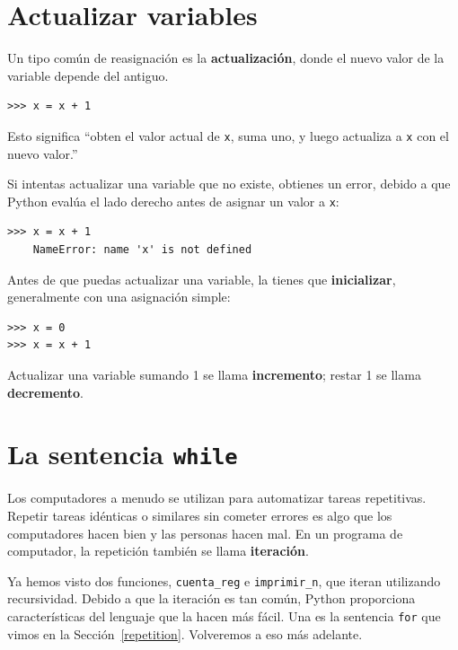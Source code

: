\documentclass[10pt]{book}
\begin{document}
\section{Actualizar variables}
\label{update}


Un tipo común de reasignación es la {\bf actualización},
donde el nuevo valor de la variable depende del antiguo.

\begin{verbatim}
>>> x = x + 1
\end{verbatim}
%
Esto significa ``obten el valor actual de {\tt x}, suma uno, y luego
actualiza a {\tt x} con el nuevo valor.''

Si intentas actualizar una variable que no existe, obtienes un
error, debido a que Python evalúa el lado derecho antes de asignar
un valor a {\tt x}:

\begin{verbatim}
>>> x = x + 1
    NameError: name 'x' is not defined
\end{verbatim}
%
Antes de que puedas actualizar una variable, la tienes que {\bf inicializar},
generalmente con una asignación simple:

\begin{verbatim}
>>> x = 0
>>> x = x + 1
\end{verbatim}
%
Actualizar una variable sumando 1 se llama {\bf incremento};
restar 1 se llama {\bf decremento}.




\section{La sentencia {\tt while}}

Los computadores a menudo se utilizan para automatizar tareas repetitivas.  Repetir
tareas idénticas o similares sin cometer errores es algo que
los computadores hacen bien y las personas hacen mal.  En un programa de computador,
la repetición también se llama {\bf iteración}.

Ya hemos visto dos funciones, {\tt cuenta\_reg} e
\verb"imprimir_n", que iteran utilizando recursividad.  Debido a que la iteración es tan
común, Python proporciona características del lenguaje que la hacen más fácil.
Una es la sentencia {\tt for} que vimos en la Sección~\ref{repetition}.
Volveremos a eso más adelante.
\end{document}
